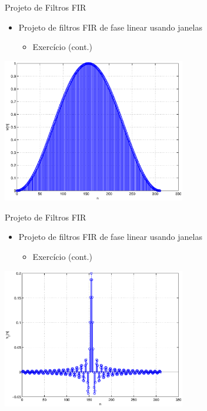 \begin{slide}{Projeto de Filtros FIR}
\begin{itemize}
   \item  Projeto de filtros FIR de fase linear usando janelas 
   \begin{itemize}
      \item Exercício (cont.)
    \end{itemize}
\end{itemize}
\includegraphics[width=0.6\textwidth]{figs/janela.eps}
\end{slide}

\begin{slide}{Projeto de Filtros FIR}
\begin{itemize}
   \item  Projeto de filtros FIR de fase linear usando janelas 
   \begin{itemize}
      \item Exercício (cont.)
    \end{itemize}
\end{itemize}
\includegraphics[width=0.6\textwidth]{figs/ideal.eps}
\end{slide}

